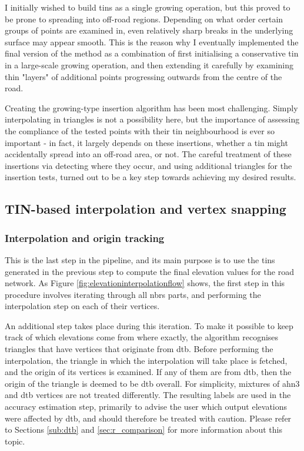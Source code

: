 I initially wished to build \ac{tin}s as a single growing operation, but this proved to be prone to spreading into off-road regions. Depending on what order certain groups of points are examined in, even relatively sharp breaks in the underlying surface may appear smooth. This is the reason why I eventually implemented the final version of the method as a combination of first initialising a conservative \ac{tin} in a large-scale growing operation, and then extending it carefully by examining thin "layers" of additional points progressing outwards from the centre of the road.

Creating the growing-type insertion algorithm has been most challenging. Simply interpolating in triangles is not a possibility here, but the importance of assessing the compliance of the tested points with their \ac{tin} neighbourhood is ever so important - in fact, it largely depends on these insertions, whether a \ac{tin} might accidentally spread into an off-road area, or not. The careful treatment of these insertions via detecting where they occur, and using additional triangles for the insertion tests, turned out to be a key step towards achieving my desired results.

\subsection{TIN-based interpolation and vertex snapping}
\label{sub:m_interpolation}

\subsubsection{Interpolation and origin tracking}

This is the last step in the pipeline, and its main purpose is to use the \ac{tin}s generated in the previous step to compute the final elevation values for the road network. As Figure \ref{fig:elevationinterpolationflow} shows, the first step in this procedure involves iterating through all \ac{nbrs} parts, and performing the interpolation step on each of their vertices.

An additional step takes place during this iteration. To make it possible to keep track of which elevations come from where exactly, the algorithm recognises triangles that have vertices that originate from \ac{dtb}. Before performing the interpolation, the triangle in which the interpolation will take place is fetched, and the origin of its vertices is examined. If any of them are from \ac{dtb}, then the origin of the triangle is deemed to be \ac{dtb} overall. For simplicity, mixtures of \ac{ahn3} and \ac{dtb} vertices are not treated differently. The resulting labels are used in the accuracy estimation step, primarily to advise the user which output elevations were affected by \ac{dtb}, and should therefore be treated with caution. Please refer to Sections \ref{sub:dtb} and \ref{sec:r_comparison} for more information about this topic.

